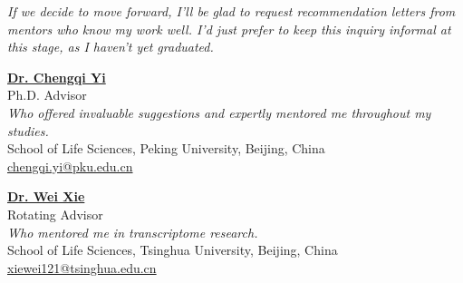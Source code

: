 \textit{
    If we decide to move forward, I’ll be glad to request recommendation letters from mentors 
    who know my work well. I’d just prefer to keep this inquiry informal at this stage, as I haven’t yet graduated.
}
\vspace{4pt}

\textbf{\href{https://www.bio.pku.edu.cn/enhomes/news/teacher_dis/91.html}{Dr. Chengqi Yi}}\\
Ph.D. Advisor \\
\textit{Who offered invaluable suggestions and expertly mentored me throughout my studies.}\\
School of Life Sciences, Peking University, Beijing, China\\
\href{mailto:chengqi.yi@pku.edu.cn}{chengqi.yi@pku.edu.cn}\\





\vspace{4pt}

\textbf{\href{https://life.tsinghua.edu.cn/lifeen/info/1034/1077.htm}{Dr. Wei Xie}}\\
Rotating Advisor\\
\textit{Who mentored me in transcriptome research.}\\
School of Life Sciences, Tsinghua University, Beijing, China\\
\href{mailto:xiewei121@tsinghua.edu.cn}{xiewei121@tsinghua.edu.cn}\\



